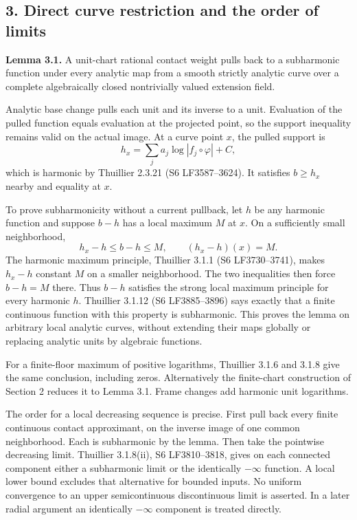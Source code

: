 \documentclass[
  10pt,
]{article}
\begin{document}
\subsection{3. Direct curve restriction and the order of
limits}\label{direct-curve-restriction-and-the-order-of-limits}

\textbf{Lemma 3.1.} A unit-chart rational contact weight pulls back to a
subharmonic function under every analytic map from a smooth strictly
analytic curve over a complete algebraically closed nontrivially valued
extension field.

Analytic base change pulls each unit and its inverse to a unit.
Evaluation of the pulled function equals evaluation at the projected
point, so the support inequality remains valid on the actual image. At a
curve point \(x\), the pulled support is
\[h_x=\sum_j a_j\log|f_j\circ\varphi|+C,\] which is harmonic by
Thuillier 2.3.21 (S6 LF3587--3624). It satisfies \(b\ge h_x\) nearby and
equality at \(x\).

To prove subharmonicity without a current pullback, let \(h\) be any
harmonic function and suppose \(b-h\) has a local maximum \(M\) at
\(x\). On a sufficiently small neighborhood,
\[h_x-h\le b-h\le M,\qquad (h_x-h)(x)=M.\] The harmonic maximum
principle, Thuillier 3.1.1 (S6 LF3730--3741), makes \(h_x-h\) constant
\(M\) on a smaller neighborhood. The two inequalities then force
\(b-h=M\) there. Thus \(b-h\) satisfies the strong local maximum
principle for every harmonic \(h\). Thuillier 3.1.12 (S6 LF3885--3896)
says exactly that a finite continuous function with this property is
subharmonic. This proves the lemma on arbitrary local analytic curves,
without extending their maps globally or replacing analytic units by
algebraic functions.

For a finite-floor maximum of positive logarithms, Thuillier 3.1.6 and
3.1.8 give the same conclusion, including zeros. Alternatively the
finite-chart construction of Section 2 reduces it to Lemma 3.1. Frame
changes add harmonic unit logarithms.

The order for a local decreasing sequence is precise. First pull back
every finite continuous contact approximant, on the inverse image of one
common neighborhood. Each is subharmonic by the lemma. Then take the
pointwise decreasing limit. Thuillier 3.1.8(ii), S6 LF3810--3818, gives
on each connected component either a subharmonic limit or the
identically \(-\infty\) function. A local lower bound excludes that
alternative for bounded inputs. No uniform convergence to an upper
semicontinuous discontinuous limit is asserted. In a later radial
argument an identically \(-\infty\) component is treated directly.
\end{document}
